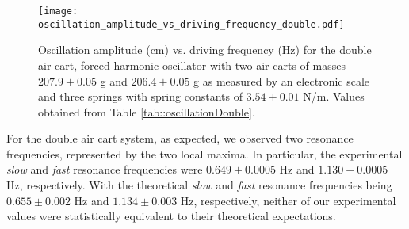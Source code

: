 \begin{figure}[H]
    \centering
	\texttt{[image: oscillation\_amplitude\_vs\_driving\_frequency\_double.pdf]}
	\label{fig::resonanceDouble}
	\caption{Oscillation amplitude (cm) vs. driving frequency (Hz) for the double air cart, forced harmonic oscillator with two air carts of masses $207.9 \pm 0.05$ g and $206.4 \pm 0.05$ g as measured by an electronic scale and three springs with spring constants of $3.54 \pm 0.01$ N/m. Values obtained from Table \ref{tab::oscillationDouble}.}
\end{figure}

For the double air cart system, as expected, we observed two resonance frequencies, represented by the two local maxima. In particular, the experimental \textit{slow} and \textit{fast} resonance frequencies were $0.649 \pm 0.0005$ Hz and $1.130 \pm 0.0005$ Hz, respectively. With the theoretical \textit{slow} and \textit{fast} resonance frequencies being $0.655 \pm 0.002$ Hz and $1.134 \pm 0.003$ Hz, respectively, neither of our experimental values were statistically equivalent to their theoretical expectations.












